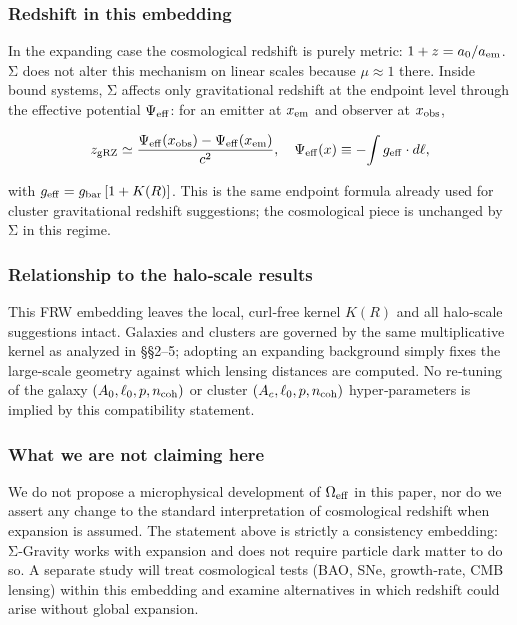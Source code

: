 \documentclass[11pt,a4paper]{article}
\begin{document}
\subsubsection{Redshift in this embedding}


In the expanding case the cosmological redshift is purely metric: $1+z = a_0/a_{\rm em}$. Σ does not alter this mechanism on linear scales because $\mu \approx 1$ there. Inside bound systems, Σ affects only gravitational redshift at the endpoint level through the effective potential $\Psi_{\rm eff}$: for an emitter at $x_{\rm em}$ and observer at $x_{\rm obs}$,


\begin{equation}
z_{\rm gRZ} \simeq \frac{\Psi_{\rm eff}(x_{\rm obs}) - \Psi_{\rm eff}(x_{\rm em})}{c^2}, \quad \Psi_{\rm eff}(x) \equiv -\!\int g_{\rm eff}\cdot d\ell,
\end{equation}


with $g_{\rm eff} = g_{\rm bar}\,[1 + K(R)]$. This is the same endpoint formula already used for cluster gravitational redshift suggestions; the cosmological piece is unchanged by Σ in this regime.


\subsubsection{Relationship to the halo‑scale results}


This FRW embedding leaves the local, curl‑free kernel $K(R)$ and all halo‑scale suggestions intact. Galaxies and clusters are governed by the same multiplicative kernel as analyzed in §§2–5; adopting an expanding background simply fixes the large‑scale geometry against which lensing distances are computed. No re‑tuning of the galaxy $(A_0, \ell_0, p, n_{\rm coh})$ or cluster $(A_c, \ell_0, p, n_{\rm coh})$ hyper‑parameters is implied by this compatibility statement.


\subsubsection{What we are not claiming here}


We do not propose a microphysical development of $\Omega_{\rm eff}$ in this paper, nor do we assert any change to the standard interpretation of cosmological redshift when expansion is assumed. The statement above is strictly a consistency embedding: Σ‑Gravity works with expansion and does not require particle dark matter to do so. A separate study will treat cosmological tests (BAO, SNe, growth‑rate, CMB lensing) within this embedding and examine alternatives in which redshift could arise without global expansion.
\end{document}

